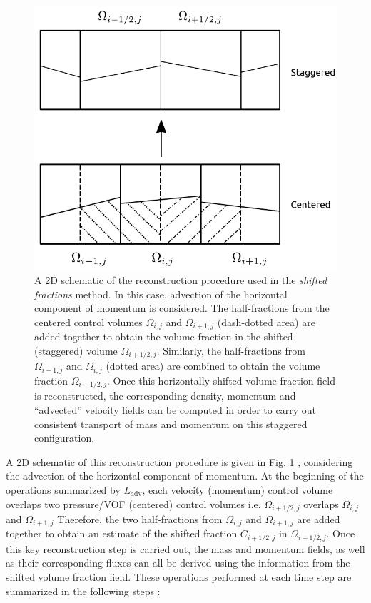 \begin{figure}
\begin{center}
\includegraphics[width=\textwidth]{plots/shifted_fractions.pdf}
\end{center}
\caption{A 2D schematic of the reconstruction procedure 
used in the \textit{shifted fractions} method. 
In this case, advection of the horizontal component of momentum is considered.
The half-fractions from the centered control volumes 
$\Omega_{i,j}$ and $\Omega_{i+1,j}$ (dash-dotted area) are added together
to obtain the volume fraction in the shifted (staggered) volume $\Omega_{i+1/2,j}$.
Similarly, the half-fractions from $\Omega_{i-1,j}$ and $\Omega_{i,j}$ (dotted area)
are combined to obtain the volume fraction $\Omega_{i-1/2,j}$.
Once this horizontally shifted volume fraction field is reconstructed, 
the corresponding density, momentum and ``advected'' velocity fields can be 
computed in order to carry out consistent transport of mass and momentum
on this staggered configuration. 
}
\label{shift_frac}
\end{figure}


A 2D schematic of this reconstruction procedure is given in Fig. \ref{shift_frac} 
, considering the advection of the horizontal component of momentum. 
At the beginning of the operations summarized by $L_{\textrm{adv}}$, 
each velocity (momentum) control volume overlaps two pressure/VOF (centered)
control volumes i.e.  $\Omega_{i+1/2,j}$ overlaps $\Omega_{i,j}$ and $\Omega_{i+1,j}$
Therefore, the two half-fractions from $\Omega_{i,j}$ and $\Omega_{i+1,j}$ are 
added together to obtain an estimate
of the shifted fraction $C_{i+1/2,j}$ in $\Omega_{i+1/2,j}$. 
Once this key reconstruction step is carried out, the mass and momentum
fields, as well as their corresponding fluxes can all be derived using the information
from the shifted volume fraction field. These operations performed at each time step
are summarized in the following steps : 


